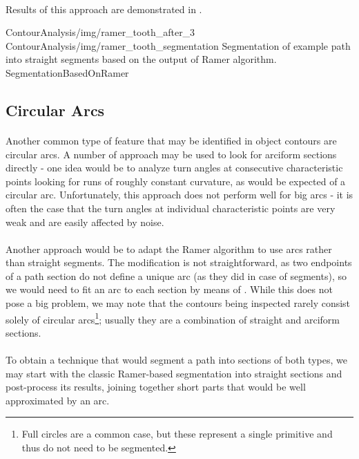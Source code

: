 \paragraph*{}
Results of this approach are demonstrated in .

\twoFigures
{ContourAnalysis/img/ramer_tooth_after_3}
{ContourAnalysis/img/ramer_tooth_segmentation}
{Segmentation of example path into straight segments based on the output of Ramer algorithm.}
{SegmentationBasedOnRamer}
{\basicWidth}

\subsection{Circular Arcs}

\paragraph*{}
Another common type of feature that may be identified in object contours are circular arcs. A number of approach may be used to look for arciform sections directly - one idea would be to analyze turn angles at consecutive characteristic points looking for runs of roughly constant curvature, as would be expected of a circular arc. Unfortunately, this approach does not perform well for big arcs - it is often the case that the turn angles at individual characteristic points are very weak and are easily affected by noise.

\paragraph*{}
Another approach would be to adapt the Ramer algorithm to use arcs rather than straight segments. The modification is not straightforward, as two endpoints of a path section do not define a unique arc (as they did in case of segments), so we would need to fit an arc to each section by means of . While this does not pose a big problem, we may note that the contours being inspected rarely consist solely of circular arcs\footnote{Full circles are a common case, but these represent a single primitive and thus do not need to be segmented.}; usually they are a combination of straight and arciform sections.

\paragraph*{}
To obtain a technique that would segment a path into sections of both types, we may start with the classic Ramer-based segmentation into straight sections and post-process its results, joining together short parts that would be well approximated by an arc.

